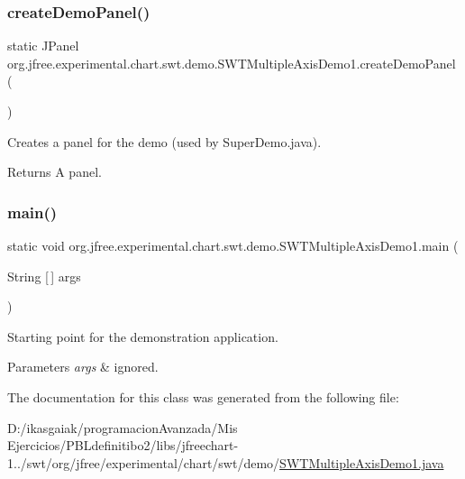 \subsubsection{\texorpdfstring{create\+Demo\+Panel()}{createDemoPanel()}}
{\footnotesize\ttfamily static J\+Panel org.\+jfree.\+experimental.\+chart.\+swt.\+demo.\+S\+W\+T\+Multiple\+Axis\+Demo1.\+create\+Demo\+Panel (\begin{DoxyParamCaption}{ }\end{DoxyParamCaption})\hspace{0.3cm}{\ttfamily [static]}}

Creates a panel for the demo (used by Super\+Demo.\+java).

\begin{DoxyReturn}{Returns}
A panel. 
\end{DoxyReturn}
\mbox{\label{classorg_1_1jfree_1_1experimental_1_1chart_1_1swt_1_1demo_1_1_s_w_t_multiple_axis_demo1_a8139ba3d5cc57989552ea58f1e661482}} 
\subsubsection{\texorpdfstring{main()}{main()}}
{\footnotesize\ttfamily static void org.\+jfree.\+experimental.\+chart.\+swt.\+demo.\+S\+W\+T\+Multiple\+Axis\+Demo1.\+main (\begin{DoxyParamCaption}\item[{String \mbox{[}$\,$\mbox{]}}]{args }\end{DoxyParamCaption})\hspace{0.3cm}{\ttfamily [static]}}

Starting point for the demonstration application.


\begin{DoxyParams}{Parameters}
{\em args} & ignored. \\
\hline
\end{DoxyParams}


The documentation for this class was generated from the following file\+:\begin{DoxyCompactItemize}
\item 
D\+:/ikasgaiak/programacion\+Avanzada/\+Mis Ejercicios/\+P\+B\+Ldefinitibo2/libs/jfreechart-\/1../swt/org/jfree/experimental/chart/swt/demo/\mbox{\hyperlink{_s_w_t_multiple_axis_demo1_8java}{S\+W\+T\+Multiple\+Axis\+Demo1.\+java}}\end{DoxyCompactItemize}
